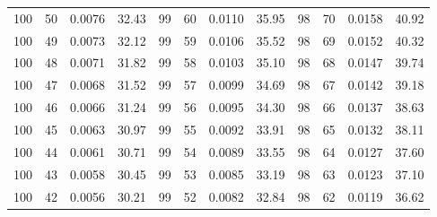 \begin{tabular}{llll|llll|llll}
100 & 50 & 0.0076 & 32.43 & 99 & 60 & 0.0110 & 35.95 & 98 & 70 & 0.0158 & 40.92\\
100 & 49 & 0.0073 & 32.12 & 99 & 59 & 0.0106 & 35.52 & 98 & 69 & 0.0152 & 40.32\\
100 & 48 & 0.0071 & 31.82 & 99 & 58 & 0.0103 & 35.10 & 98 & 68 & 0.0147 & 39.74\\
100 & 47 & 0.0068 & 31.52 & 99 & 57 & 0.0099 & 34.69 & 98 & 67 & 0.0142 & 39.18\\
100 & 46 & 0.0066 & 31.24 & 99 & 56 & 0.0095 & 34.30 & 98 & 66 & 0.0137 & 38.63\\
100 & 45 & 0.0063 & 30.97 & 99 & 55 & 0.0092 & 33.91 & 98 & 65 & 0.0132 & 38.11\\
100 & 44 & 0.0061 & 30.71 & 99 & 54 & 0.0089 & 33.55 & 98 & 64 & 0.0127 & 37.60\\
100 & 43 & 0.0058 & 30.45 & 99 & 53 & 0.0085 & 33.19 & 98 & 63 & 0.0123 & 37.10\\
100 & 42 & 0.0056 & 30.21 & 99 & 52 & 0.0082 & 32.84 & 98 & 62 & 0.0119 & 36.62\\
\bottomrule
\end{tabular}
\newpage
